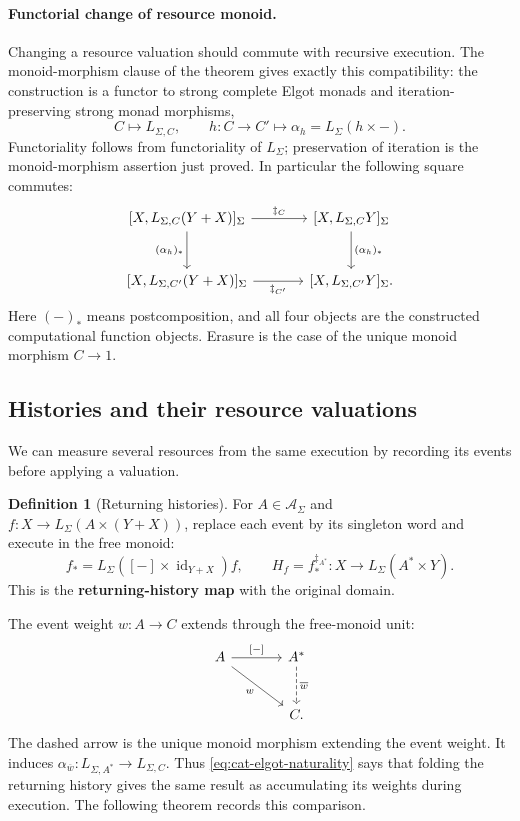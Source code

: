\documentclass[11pt,a4paper]{article}
\numberwithin{algorithm}{section}
\numberwithin{equation}{section}
\theoremstyle{definition}
\newtheorem{definition}[definition]{Definition}
\theoremstyle{remark}
\theoremstyle{plain}
\newcommand{\AS}{\mathcal A_{\Sigma}}
\newcommand{\LL}{L_{\Sigma}}
\newcommand{\LC}{L_{\Sigma,C}}
\newcommand{\id}{\operatorname{id}}
\theoremstyle{definition}
\theoremstyle{plain}
\begin{document}
\paragraph{Functorial change of resource monoid.}
Changing a resource valuation should commute with recursive execution.
The monoid-morphism clause of the theorem gives exactly this
compatibility: the construction is a functor to strong complete Elgot
monads and iteration-preserving strong monad morphisms,
\[
 C\longmapsto\LC,\qquad
 h:C\to C'\longmapsto\alpha_h=L_\Sigma(h\times-).
\]
Functoriality follows from functoriality of $L_\Sigma$; preservation
of iteration is the monoid-morphism assertion just proved.
In particular the following square commutes:
\begin{equation}\label{eq:cat-elgot-naturality}
\begin{tikzcd}[column sep=large,row sep=large]
 {[X,L_{\Sigma,C}(Y+X)]_\Sigma}
   \arrow[r,"{\ddagger_C}"] \arrow[d,"{(\alpha_h)_*}"']
   & {[X,L_{\Sigma,C}Y]_\Sigma} \arrow[d,"{(\alpha_h)_*}"]\\
 {[X,L_{\Sigma,C'}(Y+X)]_\Sigma}
   \arrow[r,"{\ddagger_{C'}}"']
   & {[X,L_{\Sigma,C'}Y]_\Sigma}.
\end{tikzcd}
\end{equation}
Here $(-)_*$ means postcomposition, and all four objects are the
constructed computational function objects.  Erasure is the case of
the unique monoid morphism $C\to1$.


\subsection{Histories and their resource valuations}
We can measure several resources from the same execution by recording
its events before applying a valuation. 

\begin{definition}[Returning histories]\label{def:returning-histories}
For $A\in\AS$ and
$f:X\to\LL(A\times(Y+X))$, replace each event by its singleton
word and execute in the free monoid:
\[
 f_* =\LL([-]\times\id_{Y+X})f,\qquad
 H_f=f_*^{\ddagger_{A^*}}:X\to\LL(A^*\times Y).
\]
This is the \textbf{returning-history map} with the original domain.
\end{definition}


The event weight $w:A\to C$ extends through the free-monoid unit:
\begin{equation}\label{eq:cat-history-universality}
\begin{tikzcd}[column sep=large,row sep=large]
 A \arrow[r,"{{[-]}}"] \arrow[dr,"{w}"']
   & A^* \arrow[d,dashed,"{\overline w}"]\\
 & C .
\end{tikzcd}
\end{equation}
The dashed arrow is the unique monoid morphism extending the event
weight. It induces
$\alpha_{\overline w}:L_{\Sigma,A^*}\to L_{\Sigma,C}$.
Thus \cref{eq:cat-elgot-naturality} says that folding the returning
history gives the same result as accumulating its weights during
execution. The following theorem records this comparison.
\end{document}
